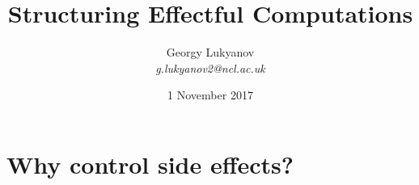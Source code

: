 

\usepackage[cache=false]{minted}

\title[]{Structuring Effectful Computations}

\subtitle{}




\author[Georgy\,Lukyanov]
{%
  \texorpdfstring{
      Georgy Lukyanov\\ \scriptsize{\textit{g.lukyanov2@ncl.ac.uk}}
  }
  {Georgy Lukyanov}
}

\date{1 November 2017}%





\begin{frame}
\titlepage
\end{frame}


\section{Why control side effects?}

